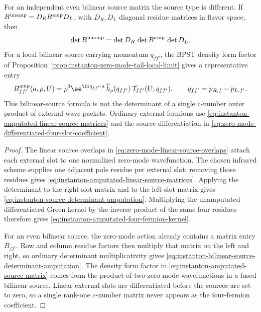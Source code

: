 \begin{proposition}
For an independent even bilinear source matrix the source type is different.
If \(B^{\rm unamp}=D_RB^{\rm amp}D_L\), with \(D_R,D_L\) diagonal residue
matrices in flavor space, then
\begin{equation}
  \det B^{\rm unamp}
  =
  \det D_R\,\det B^{\rm amp}\,\det D_L .
  \label{eq:instanton-bilinear-source-determinant-amputation}
\end{equation}
For a local bilinear source carrying momentum \(q_{ff'}\), the BPST density
form factor of Proposition~\ref{prop:instanton-zero-mode-tail-local-limit}
gives a representative entry
\begin{equation}
  B^{\rm amp}_{ff'}(a,\rho,U)
  =
  \rho^3
  \ee^{\ii q_{ff'}\cdot a}\,
  \widehat h_\rho(q_{ff'})\,
  \mathcal T_{ff'}(U;q_{ff'}),
  \qquad
  q_{ff'}=p_{R,f}-p_{L,f'} .
  \label{eq:instanton-amputated-source-matrix}
\end{equation}
This bilinear-source formula is not the determinant of a single c-number
outer product of external wave packets.  Ordinary external fermions use
\eqref{eq:instanton-amputated-linear-source-matrices} and the source
differentiation in
\eqref{eq:zero-mode-differentiated-four-slot-coefficient}.
\end{proposition}

\begin{proof}
The linear source overlaps in \eqref{eq:zero-mode-linear-source-overlaps}
attach each external slot to one normalized zero-mode wavefunction.  The
chosen infrared scheme supplies one adjacent pole residue per external slot;
removing those residues gives
\eqref{eq:instanton-amputated-linear-source-matrices}.  Applying the
determinant to the right-slot matrix and to the left-slot matrix gives
\eqref{eq:instanton-source-determinant-amputation}.  Multiplying the
unamputated differentiated Green kernel by the inverse product of the same
four residues therefore gives
\eqref{eq:instanton-amputated-four-fermion-kernel}.

For an even bilinear source, the zero-mode action already contains a matrix
entry \(B_{ff'}\).  Row and column residue factors then multiply that matrix
on the left and right, so ordinary determinant multiplicativity gives
\eqref{eq:instanton-bilinear-source-determinant-amputation}.  The density
form factor in \eqref{eq:instanton-amputated-source-matrix} comes from the
product of two zero-mode wavefunctions in a fused bilinear source.  Linear
external slots are differentiated before the sources are set to zero, so a
single rank-one c-number matrix never appears as the four-fermion coefficient.
\end{proof}

